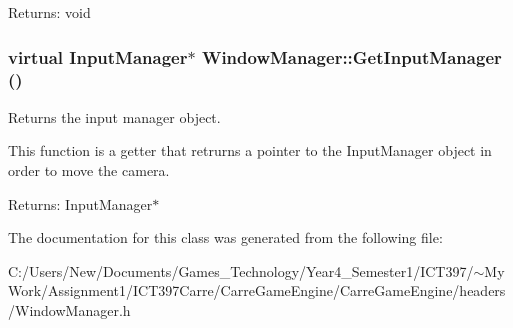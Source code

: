 \begin{Desc}
\item[Returns:]void \end{Desc}
\hypertarget{class_window_manager_a76f8df60f629cc88d98ab60e69278ed}{
\subsubsection[GetInputManager]{\setlength{\rightskip}{0pt plus 5cm}virtual InputManager$\ast$ WindowManager::GetInputManager ()}}
\label{class_window_manager_a76f8df60f629cc88d98ab60e69278ed}


Returns the input manager object. 

This function is a getter that retrurns a pointer to the InputManager object in order to move the camera.

\begin{Desc}
\item[Returns:]InputManager$\ast$ \end{Desc}


The documentation for this class was generated from the following file:\begin{CompactItemize}
\item 
C:/Users/New/Documents/Games\_\-Technology/Year4\_\-Semester1/ICT397/$\sim$My Work/Assignment1/ICT397Carre/CarreGameEngine/CarreGameEngine/headers/WindowManager.h\end{CompactItemize}
